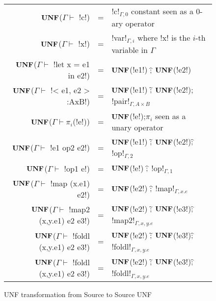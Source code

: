 \begin{figure*}[t]
    \begin{tabular}{r c l}
    $\mathbf{UNF}$($\Gamma\vdash $ !c!) &=& !c!$_{\Gamma,0}$ constant seen as a 0-ary operator\\
    $\mathbf{UNF}$($\Gamma\vdash $ !x!) &=& !var!$_{\Gamma,i}$ where !x! is the $i$-th variable in $\Gamma$ \\
    $\mathbf{UNF}$($\Gamma\vdash $ !let x = e1 in e2!) &=& $\mathbf{UNF}$(!e1!) $\widehat{;}$ $\mathbf{UNF}$(!e2!) \\ 
    $\mathbf{UNF}$($\Gamma\vdash $ !< e1, e2 > :AxB!) &=& $\mathbf{UNF}$(!e1!) $\widetilde{;}$ $\mathbf{UNF}$(!e2!); !pair!$_{\Gamma,A\times B}$ \\ 
    $\mathbf{UNF}$($\Gamma\vdash \pi_i$(!e!)) &=& $\mathbf{UNF}$(!e!);$\pi_i$ seen as a unary operator\\
    $\mathbf{UNF}$($\Gamma\vdash $ !e1 op2 e2!) &=& $\mathbf{UNF}$(!e1!) $\widetilde{;}$ $\mathbf{UNF}$(!e2!)$\widehat{;}$ !op!$_{\Gamma,2}$\\
    $\mathbf{UNF}$($\Gamma\vdash $ !op1 e!) &=& $\mathbf{UNF}$(!e!) $\widehat{;}$ !op!$_{\Gamma,1}$ \\
    $\mathbf{UNF}$($\Gamma\vdash $ !map (x.e1) e2!) &=& $\mathbf{UNF}$(!e2!) $\widehat{;}$ !map!$_{\Gamma,x.e}$\\
    $\mathbf{UNF}$($\Gamma\vdash $ !map2 (x,y.e1) e2 e3!) &=& $\mathbf{UNF}$(!e2!) $\widetilde{;}$ $\mathbf{UNF}$(!e3!)$\widehat{;}$ !map2!$_{\Gamma, x,y.e}$ \\ 
    $\mathbf{UNF}$($\Gamma\vdash $ !foldl (x,y.e1) e2 e3!) &=& $\mathbf{UNF}$(!e2!) $\widetilde{;}$ $\mathbf{UNF}$(!e3!)$\widehat{;}$ !foldl!$_{\Gamma, x,y.e}$ \\
    $\mathbf{UNF}$($\Gamma\vdash $ !foldl (x,y.e1) e2 e3!) &=& $\mathbf{UNF}$(!e2!) $\widetilde{;}$ $\mathbf{UNF}$(!e3!)$\widehat{;}$ !foldl!$_{\Gamma, x,y.e}$ \\   
    \end{tabular}
    \caption{UNF transformation from Source to Source UNF}
    \label{fig:source_to_unf}
    \end{figure*}